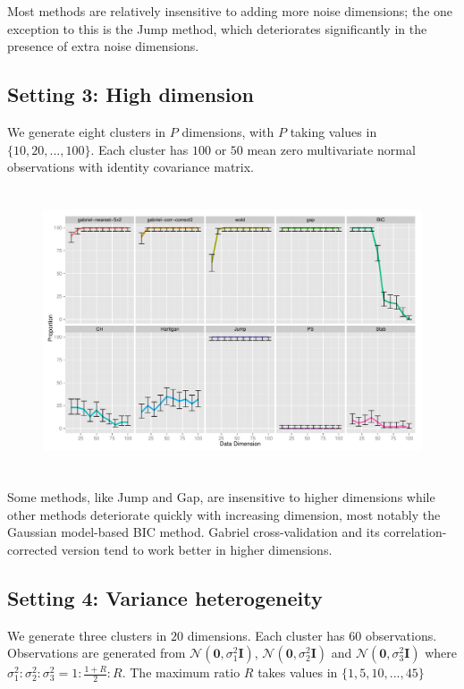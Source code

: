 \documentclass[12pt]{article}
\begin{document}
Most methods are relatively insensitive to adding more noise dimensions; the
one exception to this is the Jump method, which deteriorates significantly in
the presence of extra noise dimensions.


\subsection{Setting 3: High dimension}

We generate eight clusters in $P$ dimensions, with $P$ taking values in
$\{10,20,...,100\}$.  Each cluster has $100$ or $50$ mean zero multivariate
normal observations with identity covariance matrix. 
	
\begin{figure}[H]
\centering
\includegraphics[width=5.5in, height=3.3in]{New simulation/demo/bench/setting3/Facet.pdf}
\label{fig:setting3}
\end{figure}

Some methods, like Jump and Gap, are insensitive to higher dimensions while
other methods deteriorate quickly with increasing dimension, most notably the
Gaussian model-based BIC method.  Gabriel cross-validation and its
correlation-corrected version tend to work better in higher dimensions.
	

\subsection{Setting 4: Variance heterogeneity}

We generate three clusters in $20$ dimensions. Each cluster has $60$
observations.  Observations are generated from
$\mathcal{N}\left(\mathbf{0},\sigma_1^2\mathbf{I}\right)$,
$\mathcal{N}\left(\mathbf{0},\sigma_2^2\mathbf{I}\right)$ and
$\mathcal{N}\left(\mathbf{0},\sigma_3^2\mathbf{I}\right)$ where $\sigma_1^2 :
\sigma_2^2: \sigma_3^2 = 1:\frac{1+R}{2}:R$. The maximum ratio $R$ takes
values in $\{1,5,10,...,45\}$
	
\end{document}
